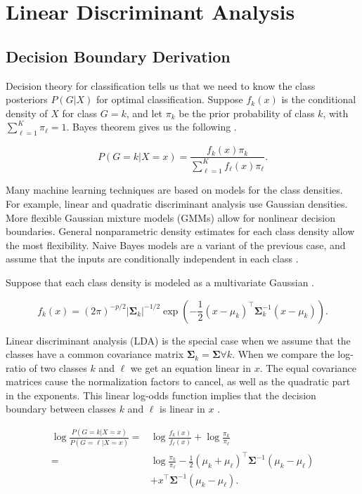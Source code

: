 \documentclass[../../../main.tex]{subfiles}
\begin{document}
\section{Linear Discriminant Analysis}\label{Appendix:LDA}

\subsection{Decision Boundary Derivation}

Decision theory for classification tells us that we need to know the class posteriors $P(G|X)$ for optimal classification. Suppose $f_k(x)$ is the conditional density of $X$ for class $G=k$, and let $\pi_k$ be the prior probability of class $k$, with $\sum_{\ell=1}^{K}\pi_\ell=1$. Bayes theorem gives us the following \autocite{Hastie2009}.

\begin{equation}
P(G=k|X=x) = \frac{f_k(x)\pi_k}{\sum_{\ell=1}^{K}f_\ell(x)\pi_\ell}.
\end{equation}

Many machine learning techniques are based on models for the class densities. For example, linear and quadratic discriminant analysis use Gaussian densities. More flexible Gaussian mixture models (GMMs) allow for nonlinear decision boundaries. General nonparametric density estimates for each class density allow the most flexibility. Naive Bayes models are a variant of the previous case, and assume that the inputs are conditionally independent in each class \autocite{Hastie2009}.

Suppose that each class density is modeled as a multivariate Gaussian \autocite{Hastie2009}.

\begin{equation}
f_k(x) = (2\pi)^{-p/2}\lvert\bm{\Sigma}_k\rvert^{-1/2}\exp\left(-\frac{1}{2}(x-\mu_k)^\top\bm{\Sigma}_k^{-1}(x-\mu_k)\right).
\end{equation}

Linear discriminant analysis (LDA) is the special case when we assume that the classes have a common covariance matrix $\bm{\Sigma}_k=\bm{\Sigma} \forall k$. When we compare the log-ratio of two classes $k$ and $\ell$ we get an equation linear in $x$. The equal covariance matrices cause the normalization factors to cancel, as well as the quadratic part in the exponents. This linear log-odds function implies that the decision boundary between classes $k$ and $\ell$ is linear in $x$ \autocite{Hastie2009}.

\begin{equation}
\begin{split}
\log\frac{P(G=k|X=x)}{P(G=\ell|X=x)} = &\log\frac{f_k(x)}{f_\ell(x)}+\log\frac{\pi_k}{\pi_\ell} \\
= &\log\frac{\pi_k}{\pi_\ell} - \frac{1}{2}(\mu_k+\mu_\ell)^\top\bm{\Sigma}^{-1}(\mu_k-\mu_\ell) \\
&+ x^\top\bm{\Sigma}^{-1}(\mu_k-\mu_\ell).
\end{split}
\label{Equation:LDA}
\end{equation}
\end{document}

